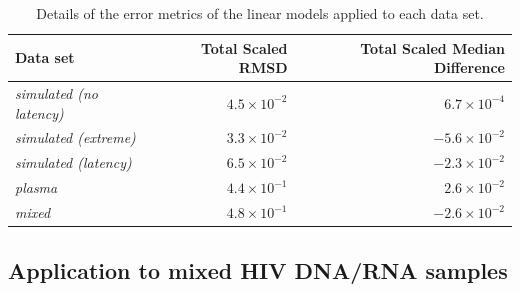 \documentclass{bmcart}
\begin{document}
\begin{table}
\def\arraystretch{1.3}%
\begin{center}
\begin{tabular}{lrr}
Data set & Total Scaled RMSD & Total Scaled Median Difference \\ %
\hline
\emph{simulated (no latency)} & $4.5 \times 10^{-2}$ & $6.7 \times 10^{-4}$ \\%
\emph{simulated (extreme)} & $3.3 \times 10^{-2}$ & $-5.6 \times 10^{-2}$ \\ %
\emph{simulated (latency)} & $6.5 \times 10^{-2}$ & $-2.3 \times 10^{-2}$ \\ %
\emph{plasma} & $4.4 \times 10^{-1}$ & $2.6 \times 10^{-2}$ \\ %
\emph{mixed} & $4.8 \times 10^{-1}$ & $-2.6 \times 10^{-2}$ \\ %
\hline
\end{tabular}
\end{center}
 \caption{
 {Details of the error metrics of the linear models applied to each data set.}
 }\label{tab:error} 
\end{table}

\subsection * {Application to mixed HIV DNA/RNA samples} \label{sec:mixed_data}


\end{document}
